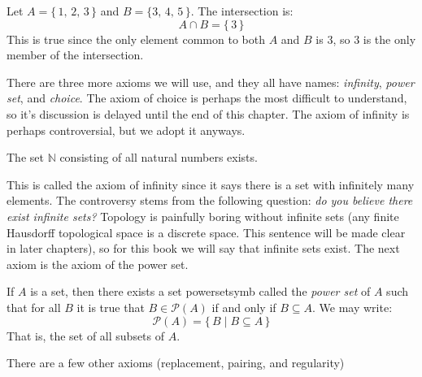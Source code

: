             \begin{example}
                Let $A=\{\,1,\,2,\,3\,\}$ and $B=\{3,\,4,\,5\,\}$. The
                intersection is:
                \begin{equation}
                    A\cap{B}=\{\,3\,\}
                \end{equation}
                This is true since the only element common to both $A$ and
                $B$ is $3$, so $3$ is the only member of the intersection.
            \end{example}
            There are three more axioms we will use, and they all have names:
            \textit{infinity}, \textit{power set}, and \textit{choice}.
            The axiom of choice is perhaps the most difficult to understand,
            so it's discussion is delayed until the end of this chapter. The
            axiom of infinity is perhaps controversial, but we adopt it anyways.
            \begin{axiom}
                The set $\mathbb{N}$ consisting of all natural numbers exists.%
            \end{axiom}
            This is called the axiom of infinity since it says there is a set
            with infinitely many elements. The controversy stems from the
            following question:
            \textit{do you believe there exist infinite sets?} Topology is
            painfully boring without infinite sets (any finite Hausdorff
            topological space is a discrete space. This sentence will be made
            clear in later chapters), so for this book we will
            say that infinite sets exist. The next axiom is the axiom of the
            power set.
            \begin{axiom}
                If $A$ is a set, then there exists a set \gls{powersetsymb}
                called the \textit{power set} of $A$ such that
                for all $B$ it is true that $B\in\mathcal{P}(A)$ if and only if
                $B\subseteq{A}$. We may write:
                \begin{equation}
                    \mathcal{P}(A)=\{\,B\;|\;B\subseteq{A}\,\}
                \end{equation}
                That is, the set of all subsets of $A$.%
            \end{axiom}
            There are a few other axioms (replacement, pairing, and regularity)
